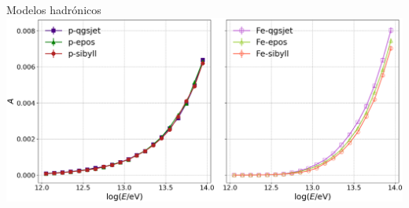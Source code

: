 \documentclass[10pt,xcolor=table]{beamer}
\begin{document}
%		
%
%		



\begin{frame}{Modelos hadr\'onicos}
\includegraphics[width=\textwidth]{Figuras/p-models_nkgA.png}
\end{frame}
\end{document}
